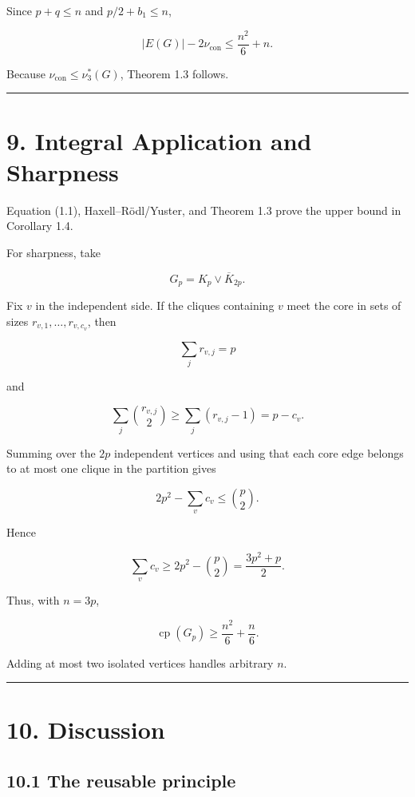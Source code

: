 \documentclass[11pt,a4paper]{article}
\begin{document}
Since \(p+q\le n\) and \(p/2+b_1\le n\),

\[
|E(G)|-2\nu_{\mathrm{con}}
\le
\frac{n^2}{6}+n.
\]

Because \(\nu_{\mathrm{con}}\le\nu_3^*(G)\), Theorem 1.3 follows.

\begin{center}\rule{0.5\linewidth}{0.5pt}\end{center}

\section{9. Integral Application and Sharpness}\label{integral-application-and-sharpness}

Equation (1.1), Haxell--Rödl/Yuster, and Theorem 1.3 prove the upper bound in Corollary 1.4.

For sharpness, take

\[
G_p=K_p\vee\overline K_{2p}.
\]

Fix \(v\) in the independent side. If the cliques containing \(v\) meet the core in sets of sizes \(r_{v,1},\ldots,r_{v,c_v}\), then

\[
\sum_jr_{v,j}=p
\]

and

\[
\sum_j\binom{r_{v,j}}2
\ge
\sum_j(r_{v,j}-1)=p-c_v.
\]

Summing over the \(2p\) independent vertices and using that each core edge belongs to at most one clique in the partition gives

\[
2p^2-\sum_vc_v\le\binom p2.
\]

Hence

\[
\sum_vc_v
\ge
2p^2-\binom p2
=
\frac{3p^2+p}{2}.
\]

Thus, with \(n=3p\),

\[
\boxed{
\operatorname{cp}(G_p)\ge\frac{n^2}{6}+\frac n6.
}
\tag{9.1}
\]

Adding at most two isolated vertices handles arbitrary \(n\).

\begin{center}\rule{0.5\linewidth}{0.5pt}\end{center}

\section{10. Discussion}\label{discussion}

\subsection{10.1 The reusable principle}\label{the-reusable-principle}
\end{document}
